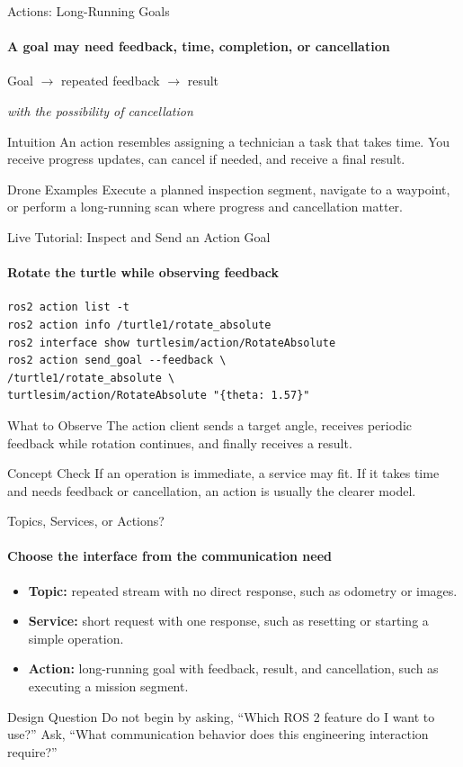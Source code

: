 \begin{frame}{Actions: Long-Running Goals}
\framesubtitle{A goal may need feedback, time, completion, or cancellation}
\begin{center}
Goal $\longrightarrow$ repeated feedback $\longrightarrow$ result

\smallskip
\textit{with the possibility of cancellation}
\end{center}
\begin{block}{Intuition}
An action resembles assigning a technician a task that takes time. You receive progress updates, can cancel if needed, and receive a final result.
\end{block}
\begin{exampleblock}{Drone Examples}
Execute a planned inspection segment, navigate to a waypoint, or perform a long-running scan where progress and cancellation matter.
\end{exampleblock}
\end{frame}

\begin{frame}[fragile]{Live Tutorial: Inspect and Send an Action Goal}
\framesubtitle{Rotate the turtle while observing feedback}
\scriptsize
\begin{verbatim}
ros2 action list -t
ros2 action info /turtle1/rotate_absolute
ros2 interface show turtlesim/action/RotateAbsolute
ros2 action send_goal --feedback \
/turtle1/rotate_absolute \
turtlesim/action/RotateAbsolute "{theta: 1.57}"
\end{verbatim}
\begin{exampleblock}{What to Observe}
The action client sends a target angle, receives periodic feedback while rotation continues, and finally receives a result.
\end{exampleblock}
\begin{alertblock}{Concept Check}
If an operation is immediate, a service may fit. If it takes time and needs feedback or cancellation, an action is usually the clearer model.
\end{alertblock}
\end{frame}

\begin{frame}{Topics, Services, or Actions?}
\framesubtitle{Choose the interface from the communication need}
\footnotesize
\begin{itemize}
\item \textbf{Topic:} repeated stream with no direct response, such as odometry or images.
\item \textbf{Service:} short request with one response, such as resetting or starting a simple operation.
\item \textbf{Action:} long-running goal with feedback, result, and cancellation, such as executing a mission segment.
\end{itemize}
\begin{exampleblock}{Design Question}
Do not begin by asking, ``Which ROS 2 feature do I want to use?'' Ask, ``What communication behavior does this engineering interaction require?''
\end{exampleblock}
\end{frame}

